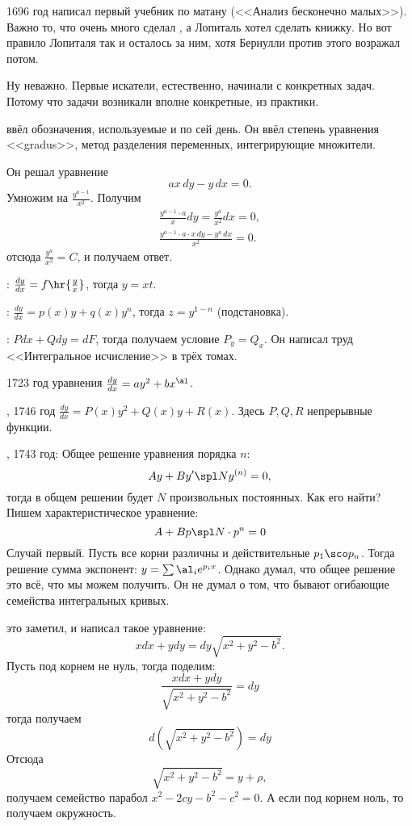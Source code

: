 \documentclass[a4paper,oneside,fleqn,10pt]{article}
\newcommand{\dx}{\,dx} \newcommand{\dy}{\,dy}
\begin{document}
1696 год  написал первый учебник по матану (<<Анализ
бесконечно малых>>).  Важно то, что очень много сделал
, а Лопиталь хотел сделать книжку.  Но вот правило
Лопиталя так и осталось за ним, хотя Бернулли против этого возражал
потом.

Ну неважно. Первые искатели, естественно, начинали с конкретных задач.
Потому что задачи возникали вполне конкретные, из практики.

 ввёл обозначения, используемые и по сей день.  Он ввёл
степень уравнения <<gradus>>, метод разделения переменных,
интегрирующие множители.

Он решал уравнение
$$ax\dy - y\dx = 0.$$ Умножим на $\frac{y^{a-1}}{x^2}$. Получим
\begin{gather*}
\frac{y^{a-1}\cdot a}{x}dy = \frac{y^a}{x^2} dx =
0,\\ \frac{y^{a-1}\cdot a \cdot x\dy - y^a\dx}{x^2} = 0.
\end{gather*}
отсюда $\frac{y^a}{x^2} = C$, и получаем ответ.

: $\frac{dy}{dx} = f\hr{\frac yx}$, тогда $y = xt$.

: $\frac{dy}{dx} = p(x) y + q(x) y^n$, тогда $z =
y^{1-n}$ (подстановка).

: $Pdx + Qdy = dF$, тогда получаем условие $P_y = Q_x$. Он
написал труд <<Интегральное исчисление>> в трёх томах.

1723 год уравнения  $\frac{dy}{dx} = ay^2 + bx^\al$.

, 1746 год $\frac{dy}{dx} = P(x)y^2 + Q(x)y + R(x)$.
Здесь $P, Q, R$ непрерывные функции.

, 1743 год: Общее решение уравнения порядка $n$:
$$Ay + B y' \spl N y^{(n)} = 0,$$ тогда в общем решении будет $N$
произвольных постоянных.  Как его найти? Пишем характеристическое
уравнение:
$$A + Bp \spl N \cdot p^n =0$$ Случай первый. Пусть все корни различны
и действительные $p_1\sco p_n$.  Тогда решение сумма экспонент: $y =
\sum \al_i e^{p_i x}$.  Однако  думал, что общее решение
это всё, что мы можем получить.  Он не думал о том, что бывают
огибающие семейства интегральных кривых.

 это заметил, и написал такое уравнение:
$$x dx + y dy = dy \sqrt{x^2 + y^2 - b^2}.$$ Пусть под корнем не нуль,
тогда поделим:
$$\frac{x dx + y dy}{\sqrt{x^2 + y^2 - b^2}} = dy$$ тогда получаем
$$d(\sqrt{x^2 + y^2 - b^2}) = dy$$ Отсюда
$$\sqrt{x^2 + y^2 - b^2} = y + \rho,$$ получаем семейство парабол $x^2
- 2cy - b^2 -c^2 = 0$.  А если под корнем ноль, то получаем
окружность.
\end{document}
